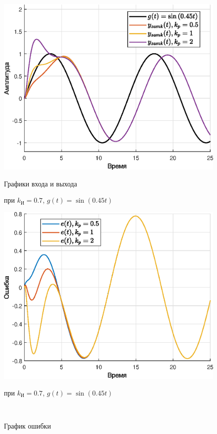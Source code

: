 \documentclass[a4paper]{article}
\begin{document}
\begin{figure}[H]
    \begin{minipage}{0.5\textwidth}
        \centering \includegraphics[width=\textwidth]{ex5/ki_0.7_g_asinwt.eps}
        \caption{Графики входа и выхода}
        \centerline{при $k_{\text{И}} = 0.7$, $g(t) = \sin{(0.45t)}$}
    \end{minipage}\hfill
    \begin{minipage}{0.5\textwidth}
        \centering \includegraphics[width=\textwidth]{ex5/ki_0.7_g_asinwt_error.eps}
        \caption{График ошибки}
        \centerline{при $k_{\text{И}} = 0.7$, $g(t) = \sin{(0.45t)}$}
    \end{minipage}\\[1em]
\end{figure}\noindent\
\end{document}
